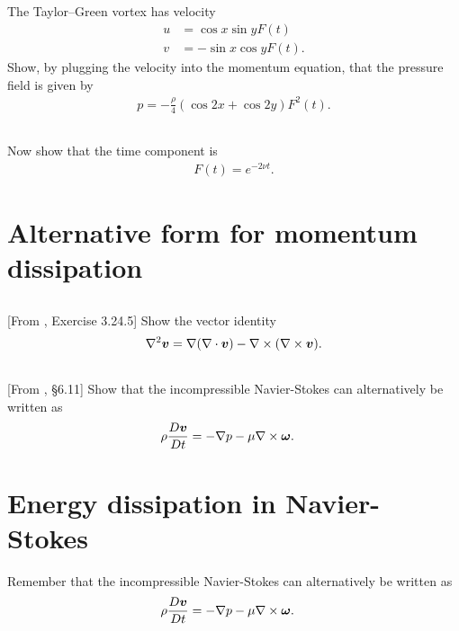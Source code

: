 \documentclass[11pt,letterpaper]{report}
\begin{document}
\subsection{}
The Taylor–Green vortex has velocity
\begin{align}
    u &= \cos x\sin y F(t)\\
    v &= -\sin x\cos y F(t).
\end{align}
Show, by plugging the velocity into the momentum equation, that the pressure field is given by
\begin{align}
    p = -\frac{\rho}{4}(\cos 2x+\cos 2y)F^2(t).
\end{align}

\subsection{}
Now show that the time component is
\begin{align}
    F(t) = e^{-2\nu t}.
\end{align}

\section{Alternative form for momentum dissipation}
\subsection{}
[From \cite{Aris_62}, Exercise 3.24.5] Show the vector identity
\begin{align}
    \nabla^2 \boldsymbol{v} = \nabla(\nabla\cdot\boldsymbol{v})-\nabla\times(\nabla\times \boldsymbol{v}).
\end{align}

\subsection{}
[From \cite{Aris_62}, \S 6.11] Show that the incompressible Navier-Stokes can alternatively be written as
\begin{align}
    \rho\frac{D\boldsymbol{v}}{Dt} &= -\nabla p-\mu\nabla\times\boldsymbol{\omega}.
\end{align}

\section{Energy dissipation in Navier-Stokes}
Remember that the incompressible Navier-Stokes can alternatively be written as
\begin{align}
    \rho\frac{D\boldsymbol{v}}{Dt} &= -\nabla p-\mu\nabla\times\boldsymbol{\omega}.
\end{align}
\end{document}
